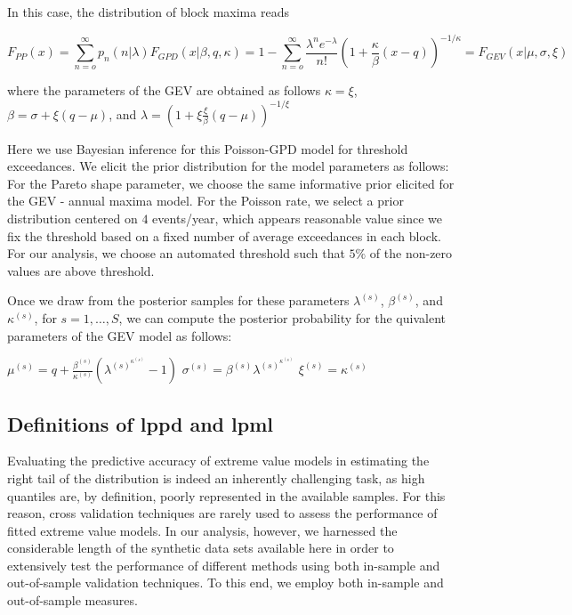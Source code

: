\documentclass[]{article}
\begin{document}
In this case, the distribution of block maxima reads

\begin{equation}
    F_{PP} \left(x \right) = \sum_{n = o}^{\infty}p_n(n \lvert \lambda)F_{GPD} \left(x \lvert
    \beta, q, \kappa \right)
    =1 - \sum_{n = o}^{\infty} \frac{\lambda^n e^{-\lambda}}{n!}\left(
    1 + \frac{\kappa}{\beta}\left( x - q\right)\right)^{-1/\kappa}
    = F_{GEV} \left( x \lvert \mu, \sigma, \xi \right)
\end{equation}

where the parameters of the GEV are obtained as follows
\(\kappa = \xi\), \(\beta = \sigma +\xi \left( q - \mu \right)\), and
\(\lambda = \left( 1 + \xi \frac{\xi}{\beta}\left( q - \mu \right)\right)^{-1/\xi}\)

Here we use Bayesian inference for this Poisson-GPD model for threshold
exceedances. We elicit the prior distribution for the model parameters
as follows: For the Pareto shape parameter, we choose the same
informative prior elicited for the GEV - annual maxima model. For the
Poisson rate, we select a prior distribution centered on \(4\)
events/year, which appears reasonable value since we fix the threshold
based on a fixed number of average exceedances in each block. For our
analysis, we choose an automated threshold such that \(5\%\) of the
non-zero values are above threshold.

Once we draw from the posterior samples for these parameters
\(\lambda^{(s)}\), \(\beta^{(s)}\), and \(\kappa^{(s)}\), for
\(s = 1, \dots, S\), we can compute the posterior probability for the
quivalent parameters of the GEV model as follows:

\(\mu^{(s)} = q + \frac{\beta^{(s)}}{\kappa^{(s)}} \left( \lambda^{(s) ^{\kappa^{(s)}}} - 1\right)\)
\(\sigma^{(s)} = \beta^{(s)} \lambda^{(s) ^{\kappa^{(s)}}}\)
\(\xi^{(s)} = \kappa^{(s)}\)

\hypertarget{definitions-of-lppd-and-lpml}{%
\subsection{Definitions of lppd and
lpml}\label{definitions-of-lppd-and-lpml}}

Evaluating the predictive accuracy of extreme value models in estimating
the right tail of the distribution is indeed an inherently challenging
task, as high quantiles are, by definition, poorly represented in the
available samples. For this reason, cross validation techniques are
rarely used to assess the performance of fitted extreme value models. In
our analysis, however, we harnessed the considerable length of the
synthetic data sets available here in order to extensively test the
performance of different methods using both in-sample and out-of-sample
validation techniques. To this end, we employ both in-sample and
out-of-sample measures.
\end{document}
